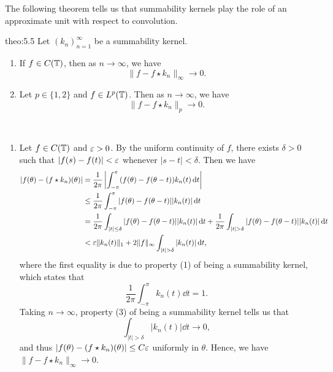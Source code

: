 The following theorem tells us that summability kernels play the role of an approximate 
unit with respect to convolution. 

\begin{theo}{theo:5.5}
    Let $(k_n)_{n=1}^\infty$ be a summability kernel. 
    \begin{enumerate}[(1)]
        \item If $f \in C(\mathbb{T})$, then as $n \to \infty$, we have 
        \[ \|f - f \star k_n\|_\infty \to 0. \] 
        \item Let $p \in \{1, 2\}$ and $f \in L^p(\mathbb{T})$. Then as $n \to \infty$, we have 
        \[ \|f - f \star k_n\|_p \to 0. \] 
    \end{enumerate}
\end{theo}
\begin{pf}~
    \begin{enumerate}[(1)]
        \item Let $f \in C(\mathbb{T})$ and $\varepsilon > 0$. By the uniform continuity of $f$, there exists 
        $\delta > 0$ such that $|f(s) - f(t)| < \varepsilon$ whenever $|s - t| < \delta$. Then we have 
        \begin{align*}
            |f(\theta) - (f \star k_n)(\theta)| 
            &= \frac{1}{2\pi} \left| \int_{-\pi}^\pi (f(\theta) - f(\theta - t)) k_n(t)\dd t \right| \\ 
            &\leq \frac{1}{2\pi} \int_{-\pi}^\pi |f(\theta) - f(\theta - t)| |k_n(t)|\dd t \\ 
            &= \frac{1}{2\pi} \int_{|t|\leq\delta} |f(\theta) - f(\theta - t)||k_n(t)|\dd t 
            + \frac{1}{2\pi} \int_{|t|>\delta} |f(\theta) - f(\theta - t)||k_n(t)|\dd t \\ 
            &< \eps\|k_n(t)\|_1 + 2\|f\|_\infty \int_{|t|>\delta} |k_n(t)|\dd t, 
        \end{align*}
        where the first equality is due to property (1) of being a summability kernel, which 
        states that 
        \[ \frac{1}{2\pi} \int_{-\pi}^\pi k_n(t)\dd t = 1. \] 
        Taking $n \to \infty$, property (3) of being a summability kernel tells us that 
        \[ \int_{|t|>\delta} |k_n(t)|\dd t \to 0, \] 
        and thus $|f(\theta) - (f \star k_n)(\theta)| \leq C\varepsilon$ uniformly in $\theta$. 
        Hence, we have $\|f - f \star k_n\|_\infty \to 0$. 


\end{enumerate}
\end{pf}
